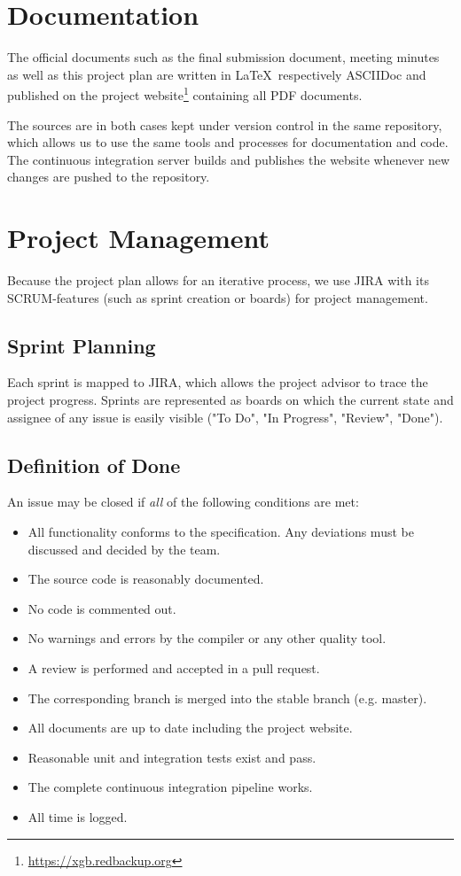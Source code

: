 \section{Documentation}
The official documents such as the final submission document, meeting minutes as well as this project plan are written in \LaTeX~respectively ASCIIDoc and published on the project website\footnote{\url{https://xgb.redbackup.org}} containing all PDF documents.

The sources are in both cases kept under version control in the same repository, which allows us to use the same tools and processes for documentation and code. The continuous integration server builds and publishes the website whenever new changes are pushed to the repository.

\section{Project Management}
Because the project plan allows for an iterative process, we use JIRA with its SCRUM-features (such as sprint creation or boards) for project management.

\subsection{Sprint Planning}
Each sprint is mapped to JIRA, which allows the project advisor to trace the project progress. Sprints are represented as boards on which the current state and assignee of any issue is easily visible ("To Do", "In Progress", "Review", "Done").


\subsection{Definition of Done}
An issue may be closed if \emph{all} of the following conditions are met:

\begin{itemize}
    \item All functionality conforms to the specification. Any deviations must be discussed and decided by the team.
    \item The source code is reasonably documented.
    \item No code is commented out.
    \item No warnings and errors by the compiler or any other quality tool.
    \item A review is performed and accepted in a pull request.
    \item The corresponding branch is merged into the stable branch (e.g. master).
    \item All documents are up to date including the project website.
    \item Reasonable unit and integration tests exist and pass.
    \item The complete continuous integration pipeline works.
    \item All time is logged.
\end{itemize}

